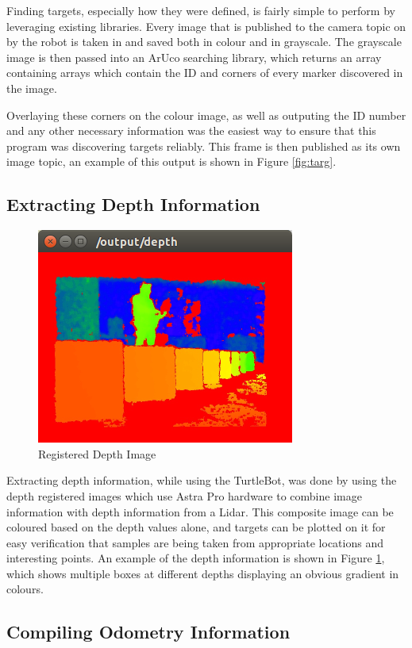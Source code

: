 \documentclass{article}[12]
\begin{document}
Finding targets, especially how they were defined, is fairly simple to perform by leveraging existing libraries. Every image that is published to the camera topic on by the robot is taken in and saved both in colour and in grayscale. The grayscale image is then passed into an ArUco searching library, which returns an array containing arrays which contain the ID and corners of every marker discovered in the image.

Overlaying these corners on the colour image, as well as outputing the ID number and any other necessary information was the easiest way to ensure that this program was discovering targets reliably. This frame is then published as its own image topic, an example of this output is shown in Figure \ref{fig:targ}.

\subsection{Extracting Depth Information}

\begin{figure}[H]
	\centering
	\includegraphics[width=0.45\linewidth]{verificationDepth}
	\caption{Registered Depth Image}
	\label{fig:deeeeeeeeeeeeeeeeeeeeeeeeeeeeeeeeeeeeeeeeeeeeeeeeeeeeeep}
\end{figure}

Extracting depth information, while using the TurtleBot, was done by using the depth registered images which use Astra Pro hardware to combine image information with depth information from a Lidar. This composite image can be coloured based on the depth values alone, and targets can be plotted on it for easy verification that samples are being taken from appropriate locations and interesting points. An example of the depth information is shown in Figure \ref{fig:deeeeeeeeeeeeeeeeeeeeeeeeeeeeeeeeeeeeeeeeeeeeeeeeeeeeeep}, which shows multiple boxes at different depths displaying an obvious gradient in colours.

\subsection{Compiling Odometry Information}
\end{document}
